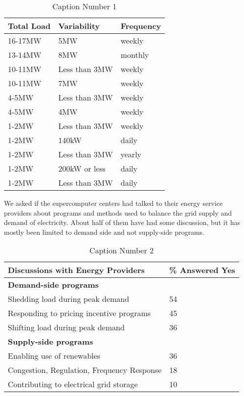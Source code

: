 \begin{table}[htbp]

\begin{center}
\caption{Caption Number 1}
\begin{tabular}{|p{65pt}|l|l|}
\hline
\textbf{Total Load}&
\textbf{Variability}&
\textbf{Frequency} \\
\hline
16-17MW&
5MW&
weekly \\
\hline
13-14MW&
8MW&
monthly \\
\hline
10-11MW&
Less than 3MW&
weekly \\
\hline
10-11MW&
7MW&
weekly \\
\hline
4-5MW&
Less than 3MW&
weekly \\
\hline
4-5MW&
4MW&
weekly \\
\hline
1-2MW&
Less than 3MW&
weekly \\
\hline
1-2MW&
140kW&
daily \\
\hline
1-2MW&
Less than 3MW&
yearly \\
\hline
1-2MW&
200kW or less&
daily \\
\hline
1-2MW&
Less than 3MW&
daily \\
\hline
\end{tabular}
\label{tab1}
\end{center}
\end{table}

We asked if the supercomputer centers had talked to their energy service
providers about programs and methods used to balance the grid supply and
demand of electricity. About half of them have had some discussion, but it
has mostly been limited to demand side and not supply-side programs.


\begin{table}[htbp]

\begin{center}
\caption{Caption Number 2}
\begin{tabular}{|p{230pt}|l|}
\hline
\textbf{Discussions with Energy Providers}&
{\%} Answered Yes \\
\hline
\textbf{Demand-side programs}&
~ \\
\hline
Shedding load during peak demand&
54 \\
\hline
Responding to pricing incentive programs&
45 \\
\hline
Shifting load during peak demand&
36 \\
\hline
\textbf{Supply-side programs}&
~ \\
\hline
Enabling use of renewables&
36 \\
\hline
Congestion, Regulation, Frequency Response&
18 \\
\hline
Contributing to electrical grid storage&
10 \\
\hline
\end{tabular}
\label{tab2}
\end{center}
\end{table}

